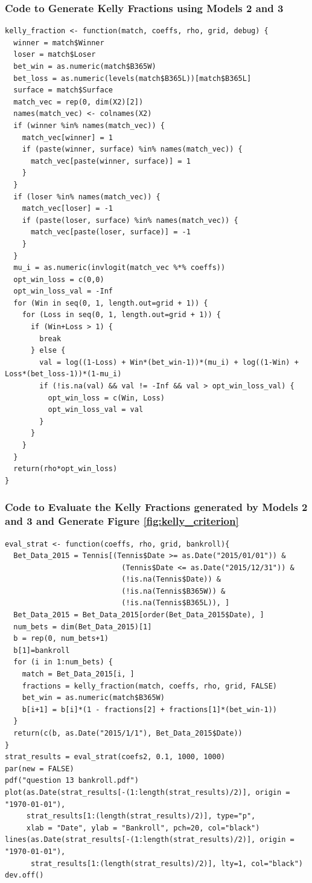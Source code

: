 \documentclass[11pt]{article} %
\begin{document}
\subsubsection*{Code to Generate Kelly Fractions using Models 2 and 3}
\begin{lstlisting}
kelly_fraction <- function(match, coeffs, rho, grid, debug) {
  winner = match$Winner
  loser = match$Loser
  bet_win = as.numeric(match$B365W)
  bet_loss = as.numeric(levels(match$B365L))[match$B365L]
  surface = match$Surface
  match_vec = rep(0, dim(X2)[2])
  names(match_vec) <- colnames(X2)
  if (winner %in% names(match_vec)) {
    match_vec[winner] = 1
    if (paste(winner, surface) %in% names(match_vec)) {
      match_vec[paste(winner, surface)] = 1
    }
  }
  if (loser %in% names(match_vec)) {
    match_vec[loser] = -1
    if (paste(loser, surface) %in% names(match_vec)) {
      match_vec[paste(loser, surface)] = -1
    }
  }
  mu_i = as.numeric(invlogit(match_vec %*% coeffs))
  opt_win_loss = c(0,0)
  opt_win_loss_val = -Inf
  for (Win in seq(0, 1, length.out=grid + 1)) {
    for (Loss in seq(0, 1, length.out=grid + 1)) {
      if (Win+Loss > 1) {
        break
      } else {
        val = log((1-Loss) + Win*(bet_win-1))*(mu_i) + log((1-Win) + Loss*(bet_loss-1))*(1-mu_i)
        if (!is.na(val) && val != -Inf && val > opt_win_loss_val) {
          opt_win_loss = c(Win, Loss)
          opt_win_loss_val = val
        }
      }
    }
  }
  return(rho*opt_win_loss)
}
\end{lstlisting}
\subsubsection*{Code to Evaluate the Kelly Fractions generated by Models 2 and 3 and Generate Figure \ref{fig:kelly_criterion}}
\begin{lstlisting}
eval_strat <- function(coeffs, rho, grid, bankroll){
  Bet_Data_2015 = Tennis[(Tennis$Date >= as.Date("2015/01/01")) &
                           (Tennis$Date <= as.Date("2015/12/31")) & 
                           (!is.na(Tennis$Date)) & 
                           (!is.na(Tennis$B365W)) & 
                           (!is.na(Tennis$B365L)), ]
  Bet_Data_2015 = Bet_Data_2015[order(Bet_Data_2015$Date), ]
  num_bets = dim(Bet_Data_2015)[1]
  b = rep(0, num_bets+1)
  b[1]=bankroll
  for (i in 1:num_bets) {
    match = Bet_Data_2015[i, ]
    fractions = kelly_fraction(match, coeffs, rho, grid, FALSE)
    bet_win = as.numeric(match$B365W)
    b[i+1] = b[i]*(1 - fractions[2] + fractions[1]*(bet_win-1))
  }
  return(c(b, as.Date("2015/1/1"), Bet_Data_2015$Date))
}
strat_results = eval_strat(coefs2, 0.1, 1000, 1000)
par(new = FALSE)
pdf("question 13 bankroll.pdf")
plot(as.Date(strat_results[-(1:length(strat_results)/2)], origin = "1970-01-01"), 
     strat_results[1:(length(strat_results)/2)], type="p",
     xlab = "Date", ylab = "Bankroll", pch=20, col="black")
lines(as.Date(strat_results[-(1:length(strat_results)/2)], origin = "1970-01-01"), 
      strat_results[1:(length(strat_results)/2)], lty=1, col="black")
dev.off()
\end{lstlisting}
\end{document}
